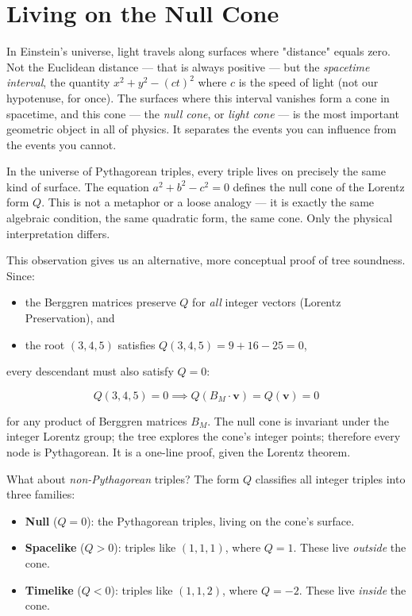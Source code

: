 \documentclass[11pt,openright,twoside]{book}
\theoremstyle{definition}
\begin{document}
\bigskip


\section{Living on the Null Cone}

In Einstein's universe, light travels along surfaces where "distance" equals zero. Not the Euclidean distance --- that is always positive --- but the \textit{spacetime interval}, the quantity $x^2 + y^2 - (ct)^2$ where $c$ is the speed of light (not our hypotenuse, for once). The surfaces where this interval vanishes form a cone in spacetime, and this cone --- the \textit{null cone}, or \textit{light cone} --- is the most important geometric object in all of physics. It separates the events you can influence from the events you cannot.

In the universe of Pythagorean triples, every triple lives on precisely the same kind of surface. The equation $a^2 + b^2 - c^2 = 0$ defines the null cone of the Lorentz form $Q$. This is not a metaphor or a loose analogy --- it is exactly the same algebraic condition, the same quadratic form, the same cone. Only the physical interpretation differs.

This observation gives us an alternative, more conceptual proof of tree soundness. Since:

\begin{itemize}[leftmargin=*]
\item the Berggren matrices preserve $Q$ for \textit{all} integer vectors (Lorentz Preservation), and
\item the root $(3, 4, 5)$ satisfies $Q(3, 4, 5) = 9 + 16 - 25 = 0$,
\end{itemize}

every descendant must also satisfy $Q = 0$:

\[Q(3, 4, 5) = 0 \implies Q(B_M \cdot \mathbf{v}) = Q(\mathbf{v}) = 0\]

for any product of Berggren matrices $B_M$. The null cone is invariant under the integer Lorentz group; the tree explores the cone's integer points; therefore every node is Pythagorean. It is a one-line proof, given the Lorentz theorem.

What about \textit{non-Pythagorean} triples? The form $Q$ classifies all integer triples into three families:

\begin{itemize}[leftmargin=*]
\item \textbf{Null} ($Q = 0$): the Pythagorean triples, living on the cone's surface.
\item \textbf{Spacelike} ($Q > 0$): triples like $(1, 1, 1)$, where $Q = 1$. These live \textit{outside} the cone.
\item \textbf{Timelike} ($Q < 0$): triples like $(1, 1, 2)$, where $Q = -2$. These live \textit{inside} the cone.
\end{itemize}
\end{document}
